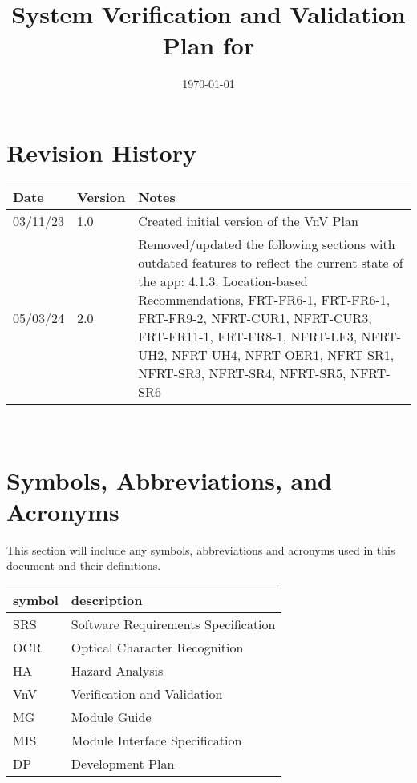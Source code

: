 \documentclass[12pt, titlepage]{article}
\begin{document}
\title{System Verification and Validation Plan for \progname{}} 
\author{\authname}
\date{\today}
	
\maketitle


\section*{Revision History}

\begin{tabularx}{\textwidth}{p{3cm}p{2cm}X}
\toprule {\bf Date} & {\bf Version} & {\bf Notes}\\
\midrule
03/11/23 & 1.0 & Created initial version of the VnV Plan\\
05/03/24 & 2.0 & Removed/updated the following sections with outdated features to reflect the current state of the app:
4.1.3: Location-based Recommendations, FRT-FR6-1, FRT-FR6-1, FRT-FR9-2, NFRT-CUR1, NFRT-CUR3, FRT-FR11-1, FRT-FR8-1, NFRT-LF3, NFRT-UH2, NFRT-UH4, NFRT-OER1, NFRT-SR1, NFRT-SR3, NFRT-SR4, NFRT-SR5, NFRT-SR6\\
\bottomrule
\end{tabularx}

~\\

\newpage

\tableofcontents

\listoftables

\newpage

\section{Symbols, Abbreviations, and Acronyms}

This section will include any symbols, abbreviations and acronyms
used in this document and their definitions. \\

\renewcommand{\arraystretch}{1.2}
\begin{tabular}{l l} 
  \toprule		
  \textbf{symbol} & \textbf{description}\\
  \midrule 
  SRS & Software Requirements Specification\\
  OCR & Optical Character Recognition\\
  HA & Hazard Analysis\\
  VnV & Verification and Validation\\
  MG & Module Guide\\
  MIS & Module Interface Specification\\
  DP & Development Plan\\
  \bottomrule
\end{tabular}\\
\end{document}
